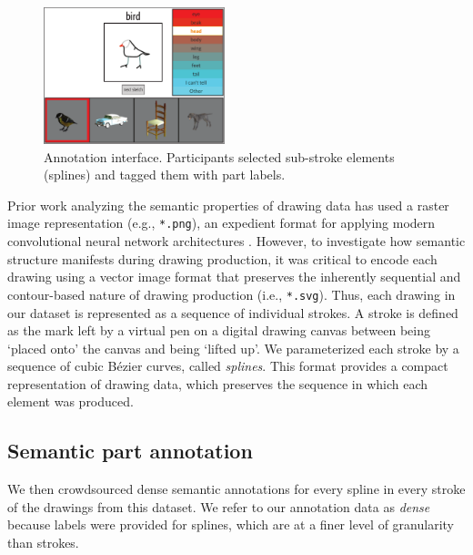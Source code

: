 \documentclass[10pt,letterpaper]{article}
\begin{document}
\begin{figure}[ht] 
\centering
\includegraphics[width=0.47\textwidth]{figures/4_annotation_interface.pdf}
\caption{Annotation interface. Participants selected sub-stroke elements (splines) and tagged them with part labels.} %
\label{annotation_interface}
\vspace{-1em}
\end{figure}

Prior work analyzing the semantic properties of drawing data has used a raster image representation (e.g., \texttt{*.png}), an expedient format for applying modern convolutional neural network architectures . 
However, to investigate how semantic structure manifests during drawing production, it was critical to encode each drawing using a vector image format that preserves the inherently sequential and contour-based nature of drawing production (i.e., \texttt{*.svg}). 
Thus, each drawing in our dataset is represented as a sequence of individual strokes. 
A stroke is defined as the mark left by a virtual pen on a digital drawing canvas between being `placed onto' the canvas and being `lifted up'. %
We parameterized each stroke by a sequence of cubic Bézier curves, called \textit{splines}.
This format provides a compact representation of drawing data, which preserves the sequence in which each element was produced.

\subsection{Semantic part annotation}

We then crowdsourced dense semantic annotations for every spline in every stroke of the drawings from this dataset. 
We refer to our annotation data as \textit{dense} because labels were provided for splines, which are at a finer level of granularity than strokes.
\end{document}
